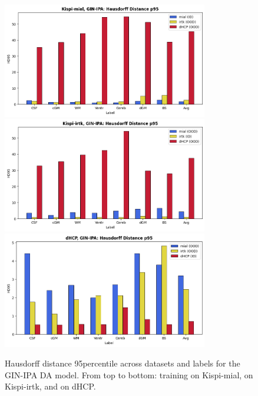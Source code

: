 \begin{figure}[htbp]
    \centering
    \includegraphics[width=0.8\textwidth]{figures/mial_ginipa_HD.png}\\
    \vspace{5pt}
    \includegraphics[width=0.8\textwidth]{figures/irtk_ginipa_HD.png}\\
    \vspace{5pt}
    \includegraphics[width=0.8\textwidth]{figures/dHCP_ginipa_HD.png}
    \caption{Hausdorff distance 95\th percentile across datasets and labels for the GIN-IPA DA model. From top to bottom: training on Kispi-mial, on Kispi-irtk, and on dHCP.}
    \label{fig:ginipa_HD}
\end{figure}


